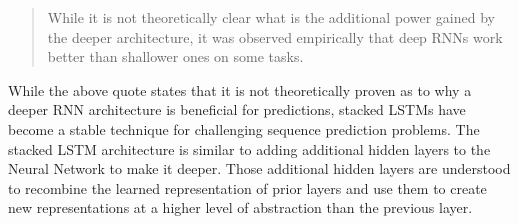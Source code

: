         \begin{quote}
            While it is not theoretically clear what is the additional power gained by the deeper architecture, it was observed empirically that deep RNNs work better than shallower ones on some tasks. \cite{goldbergPrimerNeuralNetwork2016}
            
        \end{quote}
        While the above quote states that it is not theoretically proven as to why a deeper RNN architecture is beneficial for predictions, stacked LSTMs have become a stable technique for challenging sequence prediction problems. The stacked LSTM architecture is similar to adding additional hidden layers to the Neural Network to make it deeper. Those additional hidden layers are understood to recombine the learned representation of prior layers and use them to create new representations at a higher level of abstraction than the previous layer.
